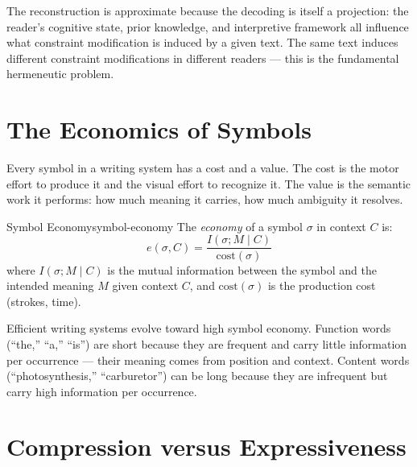 The reconstruction is approximate because the decoding is itself a
projection: the reader's cognitive state, prior knowledge, and
interpretive framework all influence what constraint modification
is induced by a given text. The same text induces different
constraint modifications in different readers — this is the
fundamental hermeneutic problem.

\section{The Economics of Symbols}

Every symbol in a writing system has a cost and a value. The cost is
the motor effort to produce it and the visual effort to recognize it.
The value is the semantic work it performs: how much meaning it carries,
how much ambiguity it resolves.

\begin{definition}{Symbol Economy}{symbol-economy}
  The \emph{economy} of a symbol $\sigma$ in context $C$ is:
  \[
    e(\sigma, C) = \frac{I(\sigma; M \mid C)}{\text{cost}(\sigma)}
  \]
  where $I(\sigma; M \mid C)$ is the mutual information between the
  symbol and the intended meaning $M$ given context $C$, and
  $\text{cost}(\sigma)$ is the production cost (strokes, time).
\end{definition}

Efficient writing systems evolve toward high symbol economy. Function
words (``the,'' ``a,'' ``is'') are short because they are frequent and
carry little information per occurrence — their meaning comes from
position and context. Content words (``photosynthesis,'' ``carburetor'')
can be long because they are infrequent but carry high information
per occurrence.

\section{Compression versus Expressiveness}

